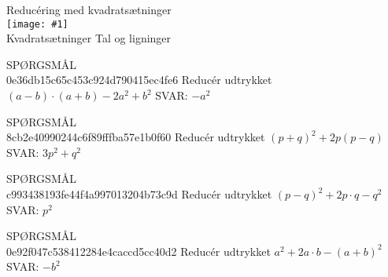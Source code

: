 \documentclass[]{article}
\newcounter{spgcounter}
\newenvironment{question}[2]{\addtocounter{spgcounter}{1} SPØRGSMÅL \thespgcounter\\}{\hspace{50px}}
\newcommand{\name}[1]{{\huge #1}\\}
\newcommand{\tag}[1]{#1}
\newcommand{\cover}[1]{\texttt{[image: \#1]}\\}
\newcommand{\answer}[1]{{\color{green} SVAR: #1}\\}
\begin{document}
\name{Reducéring med kvadratsætninger}
\cover{kvadratsætninger.png}
\tag{Kvadratsætninger}
\tag{Tal og ligninger}

\begin{question}{multi}\id{0e36db15c65c453c924d790415ec4fe6}
Reducér udtrykket $(a-b)\cdot (a+b) - 2 a^2 + b^2$
\answer{$-a^2$}
\end{question}

\begin{question}{multi}\id{8cb2e40990244c6f89fffba57e1b0f60}
Reducér udtrykket $(p+q)^2 + 2 p (p - q)$
\answer{$3 p^2 + q^2$}
\end{question}

\begin{question}{multi}\id{c993438193fe44f4a997013204b73c9d}
Reducér udtrykket $(p-q)^2+2p\cdot q - q^2$
\answer{$p^2$}
\end{question}

\begin{question}{multi}\id{0e92f047c538412284e4caccd5cc40d2}
Reducér udtrykket $a^2 + 2a \cdot b - (a+b)^2$
\answer{$-b^2$}
\end{question}
\end{document}

